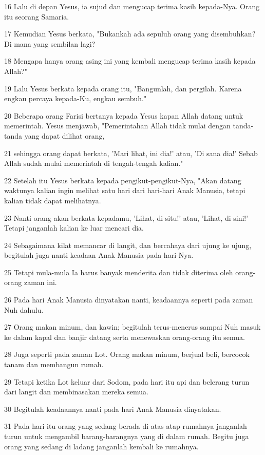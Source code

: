 \par 16 Lalu di depan Yesus, ia sujud dan mengucap terima kasih kepada-Nya. Orang itu seorang Samaria.
\par 17 Kemudian Yesus berkata, "Bukankah ada sepuluh orang yang disembuhkan? Di mana yang sembilan lagi?
\par 18 Mengapa hanya orang asing ini yang kembali mengucap terima kasih kepada Allah?"
\par 19 Lalu Yesus berkata kepada orang itu, "Bangunlah, dan pergilah. Karena engkau percaya kepada-Ku, engkau sembuh."
\par 20 Beberapa orang Farisi bertanya kepada Yesus kapan Allah datang untuk memerintah. Yesus menjawab, "Pemerintahan Allah tidak mulai dengan tanda-tanda yang dapat dilihat orang,
\par 21 sehingga orang dapat berkata, 'Mari lihat, ini dia!' atau, 'Di sana dia!' Sebab Allah sudah mulai memerintah di tengah-tengah kalian."
\par 22 Setelah itu Yesus berkata kepada pengikut-pengikut-Nya, "Akan datang waktunya kalian ingin melihat satu hari dari hari-hari Anak Manusia, tetapi kalian tidak dapat melihatnya.
\par 23 Nanti orang akan berkata kepadamu, 'Lihat, di situ!' atau, 'Lihat, di sini!' Tetapi janganlah kalian ke luar mencari dia.
\par 24 Sebagaimana kilat memancar di langit, dan bercahaya dari ujung ke ujung, begitulah juga nanti keadaan Anak Manusia pada hari-Nya.
\par 25 Tetapi mula-mula Ia harus banyak menderita dan tidak diterima oleh orang-orang zaman ini.
\par 26 Pada hari Anak Manusia dinyatakan nanti, keadaannya seperti pada zaman Nuh dahulu.
\par 27 Orang makan minum, dan kawin; begitulah terus-menerus sampai Nuh masuk ke dalam kapal dan banjir datang serta menewaskan orang-orang itu semua.
\par 28 Juga seperti pada zaman Lot. Orang makan minum, berjual beli, bercocok tanam dan membangun rumah.
\par 29 Tetapi ketika Lot keluar dari Sodom, pada hari itu api dan belerang turun dari langit dan membinasakan mereka semua.
\par 30 Begitulah keadaannya nanti pada hari Anak Manusia dinyatakan.
\par 31 Pada hari itu orang yang sedang berada di atas atap rumahnya janganlah turun untuk mengambil barang-barangnya yang di dalam rumah. Begitu juga orang yang sedang di ladang janganlah kembali ke rumahnya.
